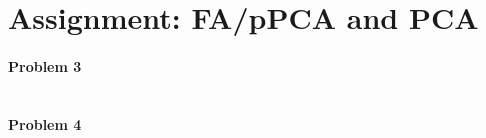 \documentclass{article}
\begin{document}
\section{Assignment: FA/pPCA and PCA}
\paragraph*{Problem 3}
$\;$



\paragraph*{Problem 4}
$\;$ 
\end{document}
